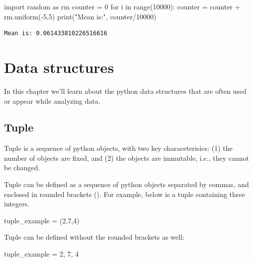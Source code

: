 \documentclass[
  letterpaper,
  DIV=11,
  numbers=noendperiod]{scrreprt}
\newenvironment{Shaded}{\begin{snugshade}}{\end{snugshade}}
\newcommand{\BuiltInTok}[1]{\textcolor[rgb]{0.00,0.23,0.31}{#1}}
\newcommand{\ControlFlowTok}[1]{\textcolor[rgb]{0.00,0.23,0.31}{#1}}
\newcommand{\DecValTok}[1]{\textcolor[rgb]{0.68,0.00,0.00}{#1}}
\newcommand{\ImportTok}[1]{\textcolor[rgb]{0.00,0.46,0.62}{#1}}
\newcommand{\KeywordTok}[1]{\textcolor[rgb]{0.00,0.23,0.31}{#1}}
\newcommand{\NormalTok}[1]{\textcolor[rgb]{0.00,0.23,0.31}{#1}}
\newcommand{\OperatorTok}[1]{\textcolor[rgb]{0.37,0.37,0.37}{#1}}
\newcommand{\StringTok}[1]{\textcolor[rgb]{0.13,0.47,0.30}{#1}}
\begin{document}
\begin{Shaded}
\begin{Highlighting}[]
\ImportTok{import}\NormalTok{ random }\ImportTok{as}\NormalTok{ rm}
\NormalTok{counter }\OperatorTok{=} \DecValTok{0}
\ControlFlowTok{for}\NormalTok{ i }\KeywordTok{in} \BuiltInTok{range}\NormalTok{(}\DecValTok{10000}\NormalTok{):}
\NormalTok{    counter }\OperatorTok{=}\NormalTok{ counter }\OperatorTok{+}\NormalTok{ rm.uniform(}\OperatorTok{{-}}\DecValTok{5}\NormalTok{,}\DecValTok{5}\NormalTok{)}
\BuiltInTok{print}\NormalTok{(}\StringTok{"Mean is:"}\NormalTok{, counter}\OperatorTok{/}\DecValTok{10000}\NormalTok{)}
\end{Highlighting}
\end{Shaded}

\begin{verbatim}
Mean is: 0.061433810226516616
\end{verbatim}

\hypertarget{data-structures}{%
\chapter{Data structures}\label{data-structures}}

In this chapter we'll learn about the python data structures that are
often used or appear while analyzing data.

\hypertarget{tuple}{%
\section{Tuple}\label{tuple}}

Tuple is a sequence of python objects, with two key characeterisics: (1)
the number of objects are fixed, and (2) the objects are immutable,
i.e., they cannot be changed.

Tuple can be defined as a sequence of python objects separated by
commas, and enclosed in rounded brackets (). For example, below is a
tuple containing three integers.

\begin{Shaded}
\begin{Highlighting}[]
\NormalTok{tuple\_example }\OperatorTok{=}\NormalTok{ (}\DecValTok{2}\NormalTok{,}\DecValTok{7}\NormalTok{,}\DecValTok{4}\NormalTok{)}
\end{Highlighting}
\end{Shaded}

Tuple can be defined without the rounded brackets as well:

\begin{Shaded}
\begin{Highlighting}[]
\NormalTok{tuple\_example }\OperatorTok{=} \DecValTok{2}\NormalTok{, }\DecValTok{7}\NormalTok{, }\DecValTok{4}
\end{Highlighting}
\end{Shaded}
\end{document}
